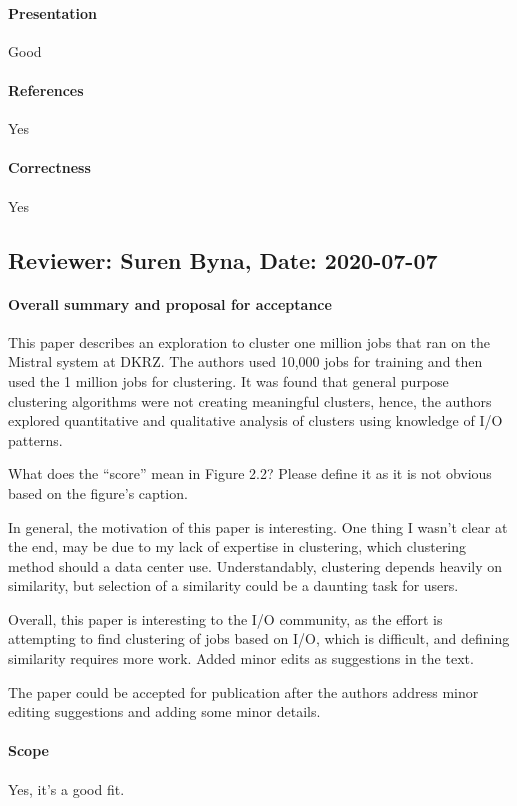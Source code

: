 \documentclass{jhps}
\begin{document}
{{{{\paragraph{Presentation}
Good
\paragraph{References}   %
Yes
\paragraph{Correctness}   %
Yes

\subsection*{Reviewer: Suren Byna, Date: 2020-07-07}

\paragraph{Overall summary and proposal for acceptance}
This paper describes an exploration to cluster one million jobs that ran on the Mistral system at DKRZ. The authors used 10,000 jobs for training and then used the 1 million jobs for clustering. It was found that general purpose clustering algorithms were not creating meaningful clusters, hence, the authors explored quantitative and qualitative analysis of clusters using knowledge of I/O patterns. 

What does the “score” mean in Figure 2.2? Please define it as it is not obvious based on the figure’s caption. 

In general, the motivation of this paper is interesting. One thing I wasn’t clear at the end, may be due to my lack of expertise in clustering, which clustering method should a data center use. Understandably, clustering depends heavily on similarity, but selection of a similarity could be a daunting task for users. 

Overall, this paper is interesting to the I/O community, as the effort is attempting to find clustering of jobs based on I/O, which is difficult, and defining similarity requires more work. 
Added minor edits as suggestions in the text.

The paper could be accepted for publication after the authors address minor editing suggestions and adding some minor details. 
\paragraph{Scope}   %
Yes, it’s a good fit.
}}}}
\end{document}
